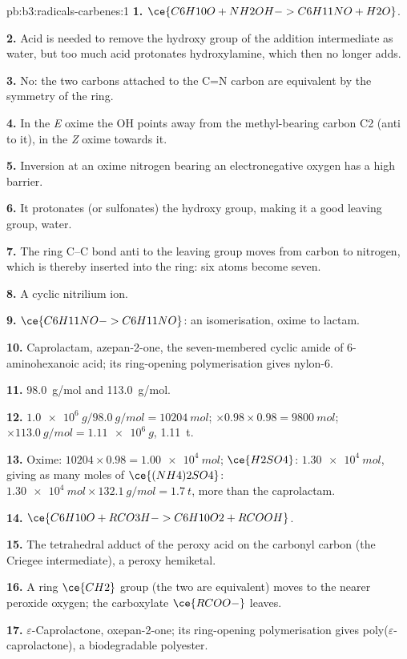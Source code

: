\begin{solution}{pb:b3:radicals-carbenes:1}
\textbf{1.} $\ce{C6H10O + NH2OH -> C6H11NO + H2O}$.

\textbf{2.} Acid is needed to remove the hydroxy group of the addition intermediate as
water, but too much acid protonates hydroxylamine, which then no longer adds.

\textbf{3.} No: the two carbons attached to the C=N carbon are equivalent by the
symmetry of the ring.

\textbf{4.} In the \textit{E} oxime the OH points away from the methyl-bearing carbon C2 (anti to
it), in the \textit{Z} oxime towards it.

\textbf{5.} Inversion at an oxime nitrogen bearing an electronegative oxygen has a high
barrier.

\textbf{6.} It protonates (or sulfonates) the hydroxy group, making it a good leaving
group, water.

\textbf{7.} The ring C--C bond anti to the leaving group moves from carbon to nitrogen,
which is thereby inserted into the ring: six atoms become seven.

\textbf{8.} A cyclic nitrilium ion.

\textbf{9.} $\ce{C6H11NO -> C6H11NO}$: an isomerisation, oxime to lactam.

\textbf{10.} Caprolactam, azepan-2-one, the seven-membered cyclic amide of
6-aminohexanoic acid; its ring-opening polymerisation gives nylon-6.

\textbf{11.} \qty{98.0}{g/mol} and \qty{113.0}{g/mol}.

\textbf{12.} $\qty{1.0e6}{g}/\qty{98.0}{g/mol} = \qty{10204}{mol}$; $\times 0.98 \times 0.98 = \qty{9800}{mol}$; $\times \qty{113.0}{g/mol} = \qty{1.11e6}{g}$, \qty{1.11}{t}.

\textbf{13.} Oxime: $\num{10204} \times 0.98 = \qty{1.00e4}{mol}$; $\ce{H2SO4}$: $\qty{1.30e4}{mol}$, giving as many moles of
$\ce{(NH4)2SO4}$: $\qty{1.30e4}{mol} \times \qty{132.1}{g/mol} = \qty{1.7}{t}$, more than the caprolactam.

\textbf{14.} $\ce{C6H10O + RCO3H -> C6H10O2 + RCOOH}$.

\textbf{15.} The tetrahedral adduct of the peroxy acid on the carbonyl carbon (the
Criegee intermediate), a peroxy hemiketal.

\textbf{16.} A ring $\ce{CH2}$ group (the two are equivalent) moves to the nearer peroxide
oxygen; the carboxylate $\ce{RCOO-}$ leaves.

\textbf{17.} $\varepsilon$-Caprolactone, oxepan-2-one; its ring-opening polymerisation gives
poly($\varepsilon$-caprolactone), a biodegradable polyester.


\end{solution}
